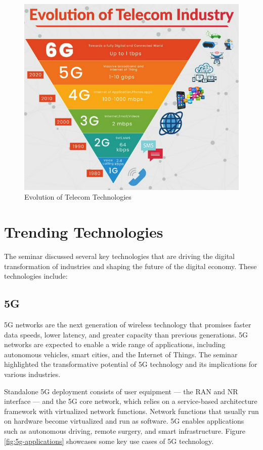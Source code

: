 \documentclass[conference]{IEEEtran}
\begin{document}
\begin{figure}[htbp]
    \centering
    \includegraphics[width=\linewidth]{images/evolution.png}
    \caption{Evolution of Telecom Technologies}
    \label{fig:telecom-evolution}
\end{figure}

\section{Trending Technologies}
The seminar discussed several key technologies that are driving the digital transformation of industries and shaping the future of the digital economy. These technologies include:

\subsection{5G}
5G networks are the next generation of wireless technology that promises faster data speeds, lower latency, and greater capacity than previous generations. 5G networks are expected to enable a wide range of applications, including autonomous vehicles, smart cities, and the Internet of Things. The seminar highlighted the transformative potential of 5G technology and its implications for various industries.
\par Standalone 5G deployment consists of user equipment — the RAN and NR interface — and the 5G core network, which relies on a service-based architecture framework with virtualized network functions. Network functions that usually run on hardware become virtualized and run as software.
5G enables applications such as autonomous driving, remote surgery, and smart infrastructure. Figure \ref{fig:5g-applications} showcases some key use cases of 5G technology.
\end{document}
